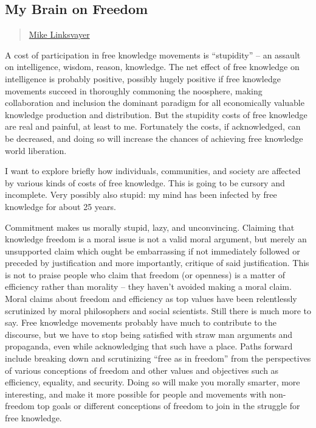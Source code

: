 \subsection{My Brain on Freedom}\label{my-brain-on-freedom}

\begin{quote}
\href{../appendix/attributions.html\#mike-linksvayer}{Mike Linksvayer}
\end{quote}

A cost of participation in free knowledge movements is ``stupidity'' --
an assault on intelligence, wisdom, reason, knowledge. The net effect of
free knowledge on intelligence is probably positive, possibly hugely
positive if free knowledge movements succeed in thoroughly commoning the
noosphere, making collaboration and inclusion the dominant paradigm for
all economically valuable knowledge production and distribution. But the
stupidity costs of free knowledge are real and painful, at least to me.
Fortunately the costs, if acknowledged, can be decreased, and doing so
will increase the chances of achieving free knowledge world liberation.

I want to explore briefly how individuals, communities, and society are
affected by various kinds of costs of free knowledge. This is going to
be cursory and incomplete. Very possibly also stupid: my mind has been
infected by free knowledge for about 25 years.

Commitment makes us morally stupid, lazy, and unconvincing. Claiming
that knowledge freedom is a moral issue is not a valid moral argument,
but merely an unsupported claim which ought be embarrassing if not
immediately followed or preceded by justification and more importantly,
critique of said justification. This is not to praise people who claim
that freedom (or openness) is a matter of efficiency rather than
morality -- they haven't avoided making a moral claim. Moral claims
about freedom and efficiency as top values have been relentlessly
scrutinized by moral philosophers and social scientists. Still there is
much more to say. Free knowledge movements probably have much to
contribute to the discourse, but we have to stop being satisfied with
straw man arguments and propaganda, even while acknowledging that such
have a place. Paths forward include breaking down and scrutinizing
``free as in freedom'' from the perspectives of various conceptions of
freedom and other values and objectives such as efficiency, equality,
and security. Doing so will make you morally smarter, more interesting,
and make it more possible for people and movements with non-freedom top
goals or different conceptions of freedom to join in the struggle for
free knowledge.

